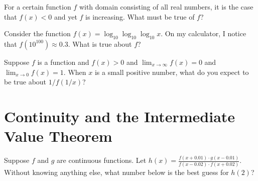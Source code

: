 \documentclass{ximera}
\begin{document}
\begin{problem}
  For a certain function $f$ with domain consisting of all real
  numbers, it is the case that $f(x) < 0$ and yet $f$ is increasing.
  What must be true of $f$?
  \begin{multipleChoice}
  \end{multipleChoice}
\end{problem}

\begin{problem}
  Consider the function $f(x) = \log_{10} \log_{10} \log_{10} x$.  On my calculator, I notice that $f(10^{100}) \approx 0.3$.  What is true about $f$?
  \begin{multipleChoice}
  \end{multipleChoice}  
\end{problem}

\begin{problem}
  Suppose $f$ is a function and $f(x) > 0$ and $\lim_{x \to \infty} f(x) = 0$ and $\lim_{x \to 0} f(x) = 1$.  When $x$ is a small positive number, what do you expect to be true about $1/f(1/x)$?
  \begin{multipleChoice}
  \end{multipleChoice}
\end{problem}

\clearpage

\section{Continuity and the Intermediate Value Theorem}

\begin{problem}
  Suppose $f$ and $g$ are continuous functions.  Let $h(x) = \frac{f(x+0.01) \cdot g(x - 0.01)}{f(x-0.02) \cdot f(x + 0.02)}$.  Without knowing anything else, what number below is the best guess for $h(2)$?
  \begin{multipleChoice}
  \end{multipleChoice}
\end{problem}
\end{document}
